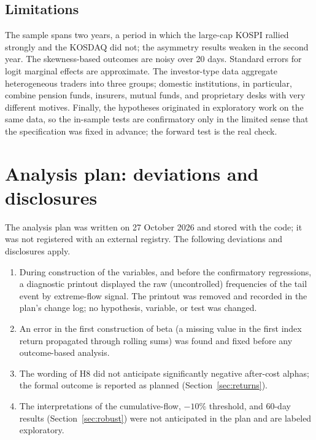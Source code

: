 \documentclass[11pt]{article}
\begin{document}
\subsection{Limitations}
The sample spans two years, a period in which the large-cap KOSPI rallied strongly and the KOSDAQ did not; the
asymmetry results weaken in the second year. The skewness-based outcomes are noisy over 20 days. Standard errors for
logit marginal effects are approximate. The investor-type data aggregate heterogeneous traders into three groups;
domestic institutions, in particular, combine pension funds, insurers, mutual funds, and proprietary desks with very
different motives. Finally, the hypotheses originated in exploratory work on the same data, so the in-sample tests are
confirmatory only in the limited sense that the specification was fixed in advance; the forward test is the real check.

\section{Analysis plan: deviations and disclosures}\label{sec:prereg}
The analysis plan was written on 27 October 2026 and stored with the code; it was not registered with an external
registry. The following deviations and disclosures apply.
\begin{enumerate}\itemsep2pt
\item During construction of the variables, and before the confirmatory regressions, a diagnostic printout displayed
the raw (uncontrolled) frequencies of the tail event by extreme-flow signal. The printout was removed and recorded in
the plan's change log; no hypothesis, variable, or test was changed.
\item An error in the first construction of beta (a missing value in the first index return propagated through rolling
sums) was found and fixed before any outcome-based analysis.
\item The wording of H8 did not anticipate significantly negative after-cost alphas; the formal outcome is reported as
planned (Section~\ref{sec:returns}).
\item The interpretations of the cumulative-flow, $-10\%$ threshold, and 60-day results (Section~\ref{sec:robust}) were
not anticipated in the plan and are labeled exploratory.
\end{enumerate}
\end{document}
